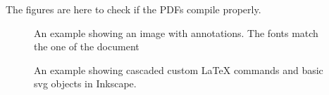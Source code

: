 \documentclass{scrartcl} %
\title{}
\date{}
\author{Fabio Muratore \\ \href{https://github.com/famura}{github.com/famura}}
\begin{document}

The figures are here to check if the PDFs compile properly.

\begin{figure}[h]
	\centering
	\def\svgwidth{0.5\columnwidth} %
	
	\caption{%
		An example showing an image with annotations. The fonts match the one of the document
	}%
\end{figure}

\begin{figure}[h]
	\centering
	
	\caption{%
		An example showing cascaded custom LaTeX commands and basic svg objects in Inkscape.
	}%
\end{figure}



\end{document}
